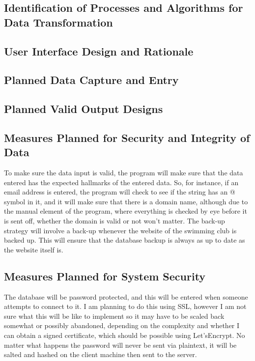 \documentclass[
11pt, %
a4paper, %
oneside, %
headinclude,footinclude, %
BCOR5mm, %
]{scrartcl}
\begin{document}
\subsection{Identification of Processes and Algorithms for Data Transformation}

\subsection{User Interface Design and Rationale}

\subsection{Planned Data Capture and Entry}

\subsection{Planned Valid Output Designs}

\subsection{Measures Planned for Security and Integrity of Data}
To make sure the data input is valid, the program will make sure that the data entered has the expected hallmarks of the entered data. So, for instance, if an email address is entered, the program will check to see if the string has an @ symbol in it, and it will make sure that there is a domain name, although due to the manual element of the program, where everything is checked by eye before it is sent off, whether the domain is valid or not won't matter. The back-up strategy will involve a back-up whenever the website of the swimming club is backed up. This will ensure that the database backup is always as up to date as the website itself is.

\subsection{Measures Planned for System Security}
The database will be password protected, and this will be entered when someone attempts to connect to it. I am planning to do this using SSL, however I am not sure what this will be like to implement so it may have to be scaled back somewhat or possibly abandoned, depending on the complexity and whether I can obtain a signed certificate, which should be possible using Let'sEncrypt. No matter what happens the password will never be sent via plaintext, it will be salted and hashed on the client machine then sent to the server. 
\end{document}
